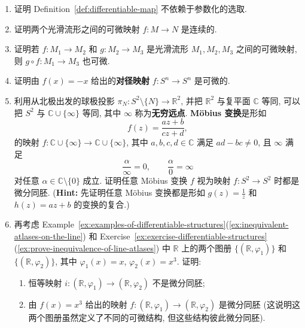 \begin{RiemannExercise}\label{ex:properties-of-differentiable-maps}
\begin{enumerate}[label=(\arabic*),ref=\arabic*,leftmargin=*]
\item\label{ex:independence-from-parametrization} 证明 Definition~\ref{def:differentiable-map} 不依赖于参数化的选取.
\item\label{ex:smooth-map-is-continuous} 证明两个光滑流形之间的可微映射 $f:M\to N$ 是连续的.
\item\label{ex:composite-of-smooth-maps} 证明若 $f:M_1\to M_2$ 和 $g:M_2\to M_3$ 是光滑流形 $M_1,M_2,M_3$ 之间的可微映射, 则 $g\circ f:M_1\to M_3$ 也可微.
\item\label{ex:smooth-antipodal-map} 证明由 $f(x)=-x$ 给出的\textbf{对径映射} $f:S^n\to S^n$ 是可微的.
\item\label{ex:mobius-transformations-of-the-sphere} 利用从北极出发的球极投影 $\pi_N:S^2\setminus\{N\}\to\mathbb{R}^2$, 并把 $\mathbb{R}^2$ 与复平面 $\mathbb{C}$ 等同, 可以把 $S^2$ 与 $\mathbb{C}\cup\{\infty\}$ 等同, 其中 $\infty$ 称为\textbf{无穷远点}. \textbf{Möbius 变换}是形如
\[
  f(z)=\frac{az+b}{cz+d},
\]
的映射 $f:\mathbb{C}\cup\{\infty\}\to\mathbb{C}\cup\{\infty\}$, 其中 $a,b,c,d\in\mathbb{C}$ 满足 $ad-bc\ne 0$, 且 $\infty$ 满足
\[
  \frac{\alpha}{\infty}=0,\qquad \frac{\alpha}{0}=\infty
\]
对任意 $\alpha\in\mathbb{C}\setminus\{0\}$ 成立. 证明任意 Möbius 变换 $f$ 视为映射 $f:S^2\to S^2$ 时都是微分同胚. {\small (\textbf{Hint:} 先证明任意 Möbius 变换都是形如 $g(z)=\frac{1}{z}$ 和 $h(z)=az+b$ 的变换的复合.)}
\item\label{ex:properties-of-differentiable-maps-part-six} 再考虑 Example~\ref{ex:examples-of-differentiable-structures}(\ref{ex:inequivalent-atlases-on-the-line}) 和 Exercise~\ref{ex:exercise-differentiable-structures}(\ref{ex:prove-inequivalence-of-line-atlases}) 中 $\mathbb{R}$ 上的两个图册 $\{(\mathbb{R},\varphi_1)\}$ 和 $\{(\mathbb{R},\varphi_2)\}$, 其中 $\varphi_1(x)=x$, $\varphi_2(x)=x^3$. 证明:
\begin{enumerate}[label=(\alph*),leftmargin=*]
\item 恒等映射 $i:(\mathbb{R},\varphi_1)\to(\mathbb{R},\varphi_2)$ 不是微分同胚;
\item 由 $f(x)=x^3$ 给出的映射 $f:(\mathbb{R},\varphi_1)\to(\mathbb{R},\varphi_2)$ 是微分同胚 (这说明这两个图册虽然定义了不同的可微结构, 但这些结构彼此微分同胚).
\end{enumerate}
\end{enumerate}
\end{RiemannExercise}
